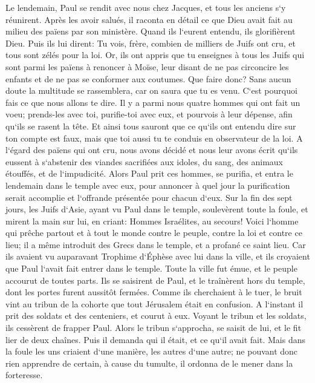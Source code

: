 \verse Le lendemain, Paul se rendit avec nous chez Jacques, et tous les anciens s`y réunirent. 
\verse Après les avoir salués, il raconta en détail ce que Dieu avait fait au milieu des païens par son ministère. 
\verse Quand ils l`eurent entendu, ils glorifièrent Dieu. Puis ils lui dirent: Tu vois, frère, combien de milliers de Juifs ont cru, et tous sont zélés pour la loi. 
\verse Or, ils ont appris que tu enseignes à tous les Juifs qui sont parmi les païens à renoncer à Moïse, leur disant de ne pas circoncire les enfants et de ne pas se conformer aux coutumes. 
\verse Que faire donc? Sans aucun doute la multitude se rassemblera, car on saura que tu es venu. 
\verse C`est pourquoi fais ce que nous allons te dire. Il y a parmi nous quatre hommes qui ont fait un voeu; 
\verse prends-les avec toi, purifie-toi avec eux, et pourvois à leur dépense, afin qu`ils se rasent la tête. Et ainsi tous sauront que ce qu`ils ont entendu dire sur ton compte est faux, mais que toi aussi tu te conduis en observateur de la loi. 
\verse A l`égard des païens qui ont cru, nous avons décidé et nous leur avons écrit qu`ils eussent à s`abstenir des viandes sacrifiées aux idoles, du sang, des animaux étouffés, et de l`impudicité. 
\verse Alors Paul prit ces hommes, se purifia, et entra le lendemain dans le temple avec eux, pour annoncer à quel jour la purification serait accomplie et l`offrande présentée pour chacun d`eux. 
\verse Sur la fin des sept jours, les Juifs d`Asie, ayant vu Paul dans le temple, soulevèrent toute la foule, et mirent la main sur lui, 
\verse en criant: Hommes Israélites, au secours! Voici l`homme qui prêche partout et à tout le monde contre le peuple, contre la loi et contre ce lieu; il a même introduit des Grecs dans le temple, et a profané ce saint lieu. 
\verse Car ils avaient vu auparavant Trophime d`Éphèse avec lui dans la ville, et ils croyaient que Paul l`avait fait entrer dans le temple. 
\verse Toute la ville fut émue, et le peuple accourut de toutes parts. Ils se saisirent de Paul, et le traînèrent hors du temple, dont les portes furent aussitôt fermées. 
\verse Comme ils cherchaient à le tuer, le bruit vint au tribun de la cohorte que tout Jérusalem était en confusion. 
\verse A l`instant il prit des soldats et des centeniers, et courut à eux. Voyant le tribun et les soldats, ils cessèrent de frapper Paul. 
\verse Alors le tribun s`approcha, se saisit de lui, et le fit lier de deux chaînes. Puis il demanda qui il était, et ce qu`il avait fait. 
\verse Mais dans la foule les uns criaient d`une manière, les autres d`une autre; ne pouvant donc rien apprendre de certain, à cause du tumulte, il ordonna de le mener dans la forteresse. 
